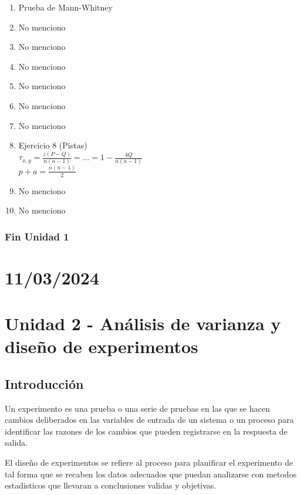 \documentclass{article}
\begin{document}
\begin{enumerate}
    \item Prueba de Mann-Whitney
    \item No menciono
    \item No menciono
    \item No menciono
    \item No menciono
    \item No menciono
    \item No menciono
    \item Ejercicio 8 (Pistas)\\
          $\tau_{x,y} = \frac{z(P-Q)}{n(n-1)} = \dots = 1 - \frac{4Q}{n(n-1)}$\\
          $p+a = \frac{n(n-1)}{2}$
    \item No menciono
    \item No menciono
\end{enumerate}

\subsubsection*{Fin Unidad 1}

\newpage

\section{11/03/2024}

\section*{Unidad 2 - Análisis de varianza y diseño de experimentos}

\subsection*{Introducción}

Un experimento es una prueba o una serie de pruebas en las que se hacen cambios deliberados en las variables de entrada de un sistema o un proceso para identificar las razones de los cambios que pueden registrarse en la respuesta de salida.

\vspace{.25cm}

El diseño de experimentos se refiere al proceso para planificar el experimento de tal forma que se recaben los datos adecuados que puedan analizarse con metodos estadisticos que llevaran a conclusiones validas y objetivas.
\end{document}
